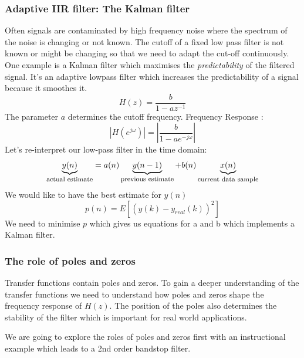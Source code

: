 \documentclass[12pt,a4paper]{article}
\begin{document}
\subsubsection{Adaptive IIR filter: The Kalman filter}
Often signals are contaminated by high frequency noise where the
spectrum of the noise is changing or not known. The cutoff of a fixed low
pass filter is not known or might be changing so that we need to adapt the cut-off continuously.
One example is a Kalman filter which maximises the
\textsl{predictability} of the filtered signal. It's an adaptive lowpass filter
which increases the predictability of a signal because it smoothes it.
\begin{equation} 
H(z) = \frac{b}{1 - a z^{-1}}
\end{equation}
The parameter $a$ determines the cutoff frequency.
Frequency Response :
\begin{equation} 
|H(e^{j \omega}) | = |\frac{b}{1 - a e^{-j \omega}}| 
\end{equation}
Let's re-interpret our low-pass filter in the time domain:
\begin{equation} 
\underbrace{y(n)}_{\mbox {\footnotesize actual estimate}} = a(n) \underbrace{y(n - 1)}_{\mbox{\footnotesize previous estimate}} + b(n)\underbrace{x(n)}_{\mbox{\footnotesize current data sample}} 
\end{equation}
We would like to have the best estimate for $y(n)$
\begin{equation} 
p(n) = E[ \left( y (k) - y_{real} (k)\right)^{2}] 
\end{equation}
We need to minimise $p$ which gives us equations for a and b which
implements a Kalman filter.




\subsubsection{The role of poles and zeros}
Transfer functions contain poles and zeros. To gain a deeper
understanding of the transfer functions we need to understand
how poles and zeros shape the frequency response of $H(z)$.
The position of the poles also determines the stability of the filter
which is important for real world applications.

We are going to explore the roles of poles and zeros first with
an instructional example which leads to a 2nd order bandstop filter.
\end{document}
